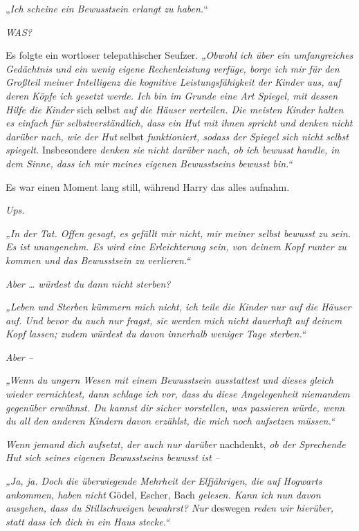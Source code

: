

\hplettrineextrapara
„\emph{Ich scheine ein Bewusstsein erlangt zu haben.}“

\emph{WAS?}

Es folgte ein wortloser telepathischer Seufzer. \emph{„Obwohl ich über ein umfangreiches Gedächtnis und ein wenig eigene Rechenleistung verfüge, borge ich mir für den Großteil meiner Intelligenz die kognitive Leistungsfähigkeit der Kinder aus, auf deren Köpfe ich gesetzt werde. Ich bin im Grunde eine Art Spiegel, mit dessen Hilfe die Kinder }sich selbst\emph{ auf die Häuser verteilen. Die meisten Kinder halten es einfach für selbstverständlich, dass ein Hut mit ihnen spricht und denken nicht darüber nach, wie der Hut }selbst\emph{ funktioniert, sodass der Spiegel sich nicht selbst spiegelt. }Insbesondere\emph{ denken sie nicht darüber nach, ob ich bewusst handle, in dem Sinne, dass ich mir meines eigenen Bewusstseins bewusst bin.“} 

Es war einen Moment lang still, während Harry das alles aufnahm. 

\emph{Ups.}

\emph{„In der Tat. Offen gesagt, es gefällt mir nicht, mir meiner selbst bewusst zu sein. Es ist unangenehm. Es wird eine Erleichterung sein, von deinem Kopf runter zu kommen und das Bewusstsein zu verlieren.“}

\emph{Aber … würdest du dann nicht sterben?}

\emph{„Leben und Sterben kümmern mich nicht, ich teile die Kinder nur auf die Häuser auf. Und bevor du auch nur fragst, sie werden mich nicht dauerhaft auf deinem Kopf lassen; zudem würdest du davon innerhalb weniger Tage sterben.“}

\emph{Aber –}

\emph{„Wenn du ungern Wesen mit einem Bewusstsein ausstattest und dieses gleich wieder vernichtest, dann schlage ich vor, dass du diese Angelegenheit niemandem gegenüber erwähnst. Du kannst dir sicher vorstellen, was passieren würde, wenn du all den anderen Kindern davon erzählst, die mich noch aufsetzen müssen.“}

\emph{Wenn jemand dich aufsetzt, der auch nur darüber} nachdenkt, \emph{ob der Sprechende Hut sich seines eigenen Bewusstseins bewusst ist –}

\emph{„Ja, ja. Doch die überwiegende Mehrheit der Elfjährigen, die auf Hogwarts ankommen, haben nicht} Gödel, Escher, Bach\emph{ gelesen. Kann ich nun davon ausgehen, dass du Stillschweigen bewahrst? Nur }deswegen\emph{ reden wir hierüber, statt dass ich dich in ein Haus stecke.“} 


